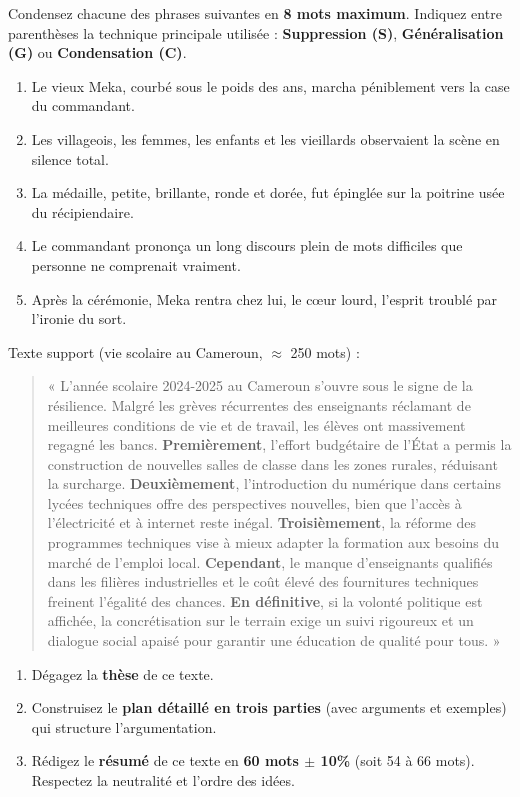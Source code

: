 \documentclass[11pt]{article}
\begin{document}
\begin{exercice}
Condensez chacune des phrases suivantes en \textbf{8 mots maximum}. Indiquez entre parenthèses la technique principale utilisée : \textbf{Suppression (S)}, \textbf{Généralisation (G)} ou \textbf{Condensation (C)}.
\begin{enumerate}
    \item Le vieux Meka, courbé sous le poids des ans, marcha péniblement vers la case du commandant.
    \item Les villageois, les femmes, les enfants et les vieillards observaient la scène en silence total.
    \item La médaille, petite, brillante, ronde et dorée, fut épinglée sur la poitrine usée du récipiendaire.
    \item Le commandant prononça un long discours plein de mots difficiles que personne ne comprenait vraiment.
    \item Après la cérémonie, Meka rentra chez lui, le cœur lourd, l'esprit troublé par l'ironie du sort.
\end{enumerate}
\end{exercice}

\begin{exercice}
Texte support (vie scolaire au Cameroun, $\approx$ 250 mots) :
\begin{quote}
« L'année scolaire 2024-2025 au Cameroun s'ouvre sous le signe de la résilience. Malgré les grèves récurrentes des enseignants réclamant de meilleures conditions de vie et de travail, les élèves ont massivement regagné les bancs. \textbf{Premièrement}, l'effort budgétaire de l'État a permis la construction de nouvelles salles de classe dans les zones rurales, réduisant la surcharge. \textbf{Deuxièmement}, l'introduction du numérique dans certains lycées techniques offre des perspectives nouvelles, bien que l'accès à l'électricité et à internet reste inégal. \textbf{Troisièmement}, la réforme des programmes techniques vise à mieux adapter la formation aux besoins du marché de l'emploi local. \textbf{Cependant}, le manque d'enseignants qualifiés dans les filières industrielles et le coût élevé des fournitures techniques freinent l'égalité des chances. \textbf{En définitive}, si la volonté politique est affichée, la concrétisation sur le terrain exige un suivi rigoureux et un dialogue social apaisé pour garantir une éducation de qualité pour tous. »
\end{quote}
\begin{enumerate}
    \item Dégagez la \textbf{thèse} de ce texte.
    \item Construisez le \textbf{plan détaillé en trois parties} (avec arguments et exemples) qui structure l'argumentation.
    \item Rédigez le \textbf{résumé} de ce texte en \textbf{60 mots $\pm$ 10\%} (soit 54 à 66 mots). Respectez la neutralité et l'ordre des idées.
\end{enumerate}
\end{exercice}
\end{document}
